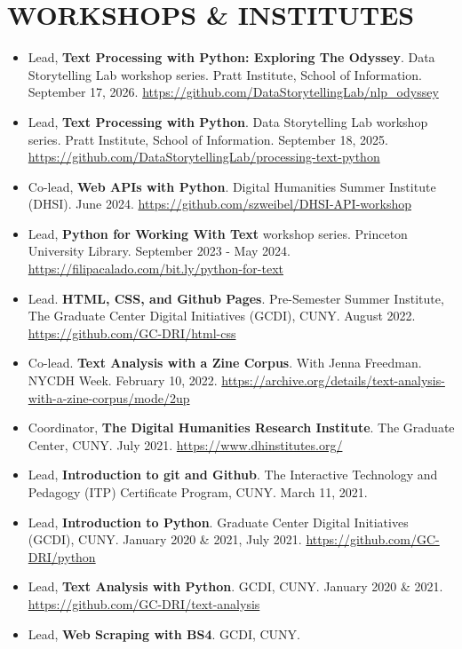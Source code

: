 \documentclass[a4paper,11pt]{article}
\begin{document}
\section*{WORKSHOPS \& INSTITUTES}
\label{sec:org433ebe3}
\begin{itemize}
\item Lead, \textbf{\textbf{Text Processing with Python: Exploring The Odyssey}}. Data
Storytelling Lab workshop series. Pratt Institute, School of
Information. September 17, 2026.
\url{https://github.com/DataStorytellingLab/nlp\_odyssey}
\item Lead, \textbf{\textbf{Text Processing with Python}}. Data Storytelling Lab
workshop series. Pratt Institute, School of Information. September
18, 2025.
\url{https://github.com/DataStorytellingLab/processing-text-python}
\item Co-lead, \textbf{\textbf{Web APIs with Python}}. Digital Humanities Summer
Institute (DHSI). June 2024.
\url{https://github.com/szweibel/DHSI-API-workshop}
\item Lead, \textbf{\textbf{Python for Working With Text}} workshop series. Princeton
University Library. September 2023 - May 2024.
\url{https://filipacalado.com/bit.ly/python-for-text}
\item Lead. \textbf{\textbf{HTML, CSS, and Github Pages}}. Pre-Semester Summer
Institute, The Graduate Center Digital Initiatives (GCDI), CUNY.
August 2022. \url{https://github.com/GC-DRI/html-css}
\item Co-lead. \textbf{\textbf{Text Analysis with a Zine Corpus}}. With Jenna Freedman.
NYCDH Week. February 10, 2022.
\url{https://archive.org/details/text-analysis-with-a-zine-corpus/mode/2up}
\item Coordinator, \textbf{\textbf{The Digital Humanities Research Institute}}. The
Graduate Center, CUNY. July 2021. \url{https://www.dhinstitutes.org/}
\item Lead, \textbf{\textbf{Introduction to git and Github}}. The Interactive Technology
and Pedagogy (ITP) Certificate Program, CUNY. March 11, 2021.
\item Lead, \textbf{\textbf{Introduction to Python}}. Graduate Center Digital
Initiatives (GCDI), CUNY. January 2020 \& 2021, July 2021.
\url{https://github.com/GC-DRI/python}
\item Lead, \textbf{\textbf{Text Analysis with Python}}. GCDI, CUNY. January 2020
\& 2021. \url{https://github.com/GC-DRI/text-analysis}
\item Lead, \textbf{\textbf{Web Scraping with BS4}}. GCDI, CUNY.

\end{itemize}
\end{document}
